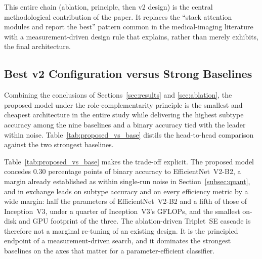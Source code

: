 This entire chain (ablation, principle, then v2 design) is the central
methodological contribution of the paper. It replaces the ``stack attention
modules and report the best'' pattern common in the medical-imaging literature
with a measurement-driven design rule that explains, rather than merely
exhibits, the final architecture.

\subsection{Best v2 Configuration versus Strong Baselines}\label{subsec:bestv2}

Combining the conclusions of Sections~\ref{sec:results} and \ref{sec:ablation},
the proposed model under the role-complementarity principle is the smallest and
cheapest architecture in the entire study while delivering the highest subtype
accuracy among the nine baselines and a binary accuracy tied with the leader
within noise. Table~\ref{tab:proposed_vs_base} distils the head-to-head
comparison against the two strongest baselines.

\begin{table}[!t]
\caption{Digest of Tables~\ref{tab:benchmark} and \ref{tab:efficiency} for the
proposed model and the two strongest baselines. Bold marks the best
value in each row.}
\label{tab:proposed_vs_base}
\centering
{}
\end{table}

Table~\ref{tab:proposed_vs_base} makes the trade-off explicit. The proposed
model concedes $0.30$ percentage points of binary accuracy to
EfficientNet~V2-B2, a margin already established as within single-run noise
in Section~\ref{subsec:quant}, and in exchange leads on subtype accuracy and
on every efficiency metric by a wide margin: half the parameters of
EfficientNet~V2-B2 and a fifth of those of Inception~V3, under a quarter of
Inception~V3's GFLOPs, and the smallest on-disk and GPU footprint of the three.
The ablation-driven Triplet~\arrowto{}SE cascade is therefore not a marginal
re-tuning of an existing design. It is the principled endpoint of a
measurement-driven search, and it dominates the strongest baselines on the axes
that matter for a parameter-efficient classifier.
